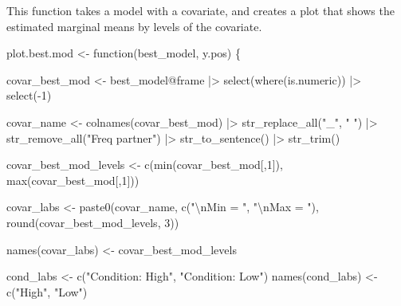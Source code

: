 \documentclass[
  bookmarksnumbered]{article}
\newenvironment{Shaded}{\begin{snugshade}}{\end{snugshade}}
\newcommand{\ControlFlowTok}[1]{\textcolor[rgb]{0.94,0.87,0.69}{#1}}
\newcommand{\DecValTok}[1]{\textcolor[rgb]{0.86,0.86,0.80}{#1}}
\newcommand{\FunctionTok}[1]{\textcolor[rgb]{0.94,0.94,0.56}{#1}}
\newcommand{\NormalTok}[1]{\textcolor[rgb]{0.80,0.80,0.80}{#1}}
\newcommand{\OtherTok}[1]{\textcolor[rgb]{0.94,0.94,0.56}{#1}}
\newcommand{\SpecialCharTok}[1]{\textcolor[rgb]{0.86,0.64,0.64}{#1}}
\newcommand{\StringTok}[1]{\textcolor[rgb]{0.80,0.58,0.58}{#1}}
\begin{document}
This function takes a model with a covariate, and creates a plot that shows the estimated marginal means by levels of the covariate.

\begin{Shaded}
\begin{Highlighting}[]
\NormalTok{plot.best.mod }\OtherTok{\textless{}{-}} \ControlFlowTok{function}\NormalTok{(best\_model, y.pos) \{}
  
\NormalTok{  covar\_best\_mod }\OtherTok{\textless{}{-}}\NormalTok{ best\_model}\SpecialCharTok{@}\NormalTok{frame }\SpecialCharTok{|\textgreater{}} 
    \FunctionTok{select}\NormalTok{(}\FunctionTok{where}\NormalTok{(is.numeric)) }\SpecialCharTok{|\textgreater{}} 
    \FunctionTok{select}\NormalTok{(}\SpecialCharTok{{-}}\DecValTok{1}\NormalTok{)}
  
\NormalTok{  covar\_name }\OtherTok{\textless{}{-}} \FunctionTok{colnames}\NormalTok{(covar\_best\_mod) }\SpecialCharTok{|\textgreater{}}
    \FunctionTok{str\_replace\_all}\NormalTok{(}\StringTok{"\_"}\NormalTok{, }\StringTok{" "}\NormalTok{) }\SpecialCharTok{|\textgreater{}} 
    \FunctionTok{str\_remove\_all}\NormalTok{(}\StringTok{"Freq partner"}\NormalTok{) }\SpecialCharTok{|\textgreater{}} 
    \FunctionTok{str\_to\_sentence}\NormalTok{() }\SpecialCharTok{|\textgreater{}} 
    \FunctionTok{str\_trim}\NormalTok{()}
  
\NormalTok{  covar\_best\_mod\_levels }\OtherTok{\textless{}{-}} \FunctionTok{c}\NormalTok{(}\FunctionTok{min}\NormalTok{(covar\_best\_mod[,}\DecValTok{1}\NormalTok{]),}
                             \FunctionTok{max}\NormalTok{(covar\_best\_mod[,}\DecValTok{1}\NormalTok{]))}
  
\NormalTok{  covar\_labs }\OtherTok{\textless{}{-}} \FunctionTok{paste0}\NormalTok{(covar\_name,}
                       \FunctionTok{c}\NormalTok{(}\StringTok{"}\SpecialCharTok{\textbackslash{}n}\StringTok{Min = "}\NormalTok{, }\StringTok{"}\SpecialCharTok{\textbackslash{}n}\StringTok{Max = "}\NormalTok{),}
                       \FunctionTok{round}\NormalTok{(covar\_best\_mod\_levels, }\DecValTok{3}\NormalTok{))}
  
  \FunctionTok{names}\NormalTok{(covar\_labs) }\OtherTok{\textless{}{-}}\NormalTok{ covar\_best\_mod\_levels}
  
\NormalTok{  cond\_labs }\OtherTok{\textless{}{-}} \FunctionTok{c}\NormalTok{(}\StringTok{"Condition: High"}\NormalTok{, }\StringTok{"Condition: Low"}\NormalTok{)}
  \FunctionTok{names}\NormalTok{(cond\_labs) }\OtherTok{\textless{}{-}} \FunctionTok{c}\NormalTok{(}\StringTok{"High"}\NormalTok{, }\StringTok{"Low"}\NormalTok{)}
  

\end{Highlighting}
\end{Shaded}
\end{document}
